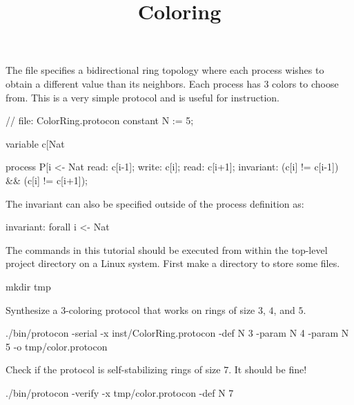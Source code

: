 
\title{Coloring}
\date{}



The  file specifies a bidirectional ring topology where each process wishes to obtain a different value than its neighbors.
Each process has $3$ colors to choose from.
This is a very simple protocol and is useful for instruction.

\begin{code}
// file: ColorRing.protocon
constant N := 5;

variable c[Nat %

process P[i <- Nat %
{
  read: c[i-1];
  write: c[i];
  read: c[i+1];
  invariant: (c[i] != c[i-1]) && (c[i] != c[i+1]);
}
\end{code}
The invariant can also be specified outside of the process definition as:
\begin{code}
invariant: forall i <- Nat %
\end{code}

The commands in this tutorial should be executed from within the top-level project directory on a Linux system.
First make a directory  to store some files.
\begin{code}
mkdir tmp
\end{code}

Synthesize a 3-coloring protocol that works on rings of size $3$, $4$, and $5$.
\begin{code}
./bin/protocon -serial -x inst/ColorRing.protocon -def N 3 -param N 4 -param N 5 -o tmp/color.protocon
\end{code}

Check if the protocol is self-stabilizing rings of size $7$. It should be fine!
\begin{code}
./bin/protocon -verify -x tmp/color.protocon -def N 7
\end{code}

